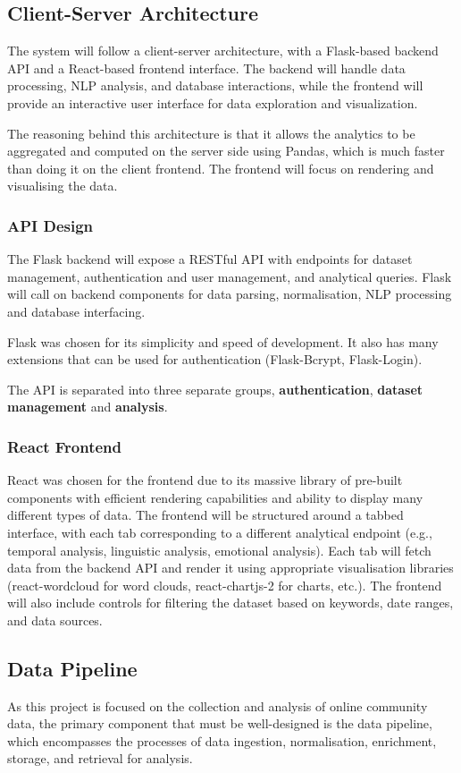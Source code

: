 \documentclass[12pt, a4paper]{article}
\begin{document}
\subsection{Client-Server Architecture}
The system will follow a client-server architecture, with a Flask-based backend API and a React-based frontend interface. The backend will handle data processing, NLP analysis, and database interactions, while the frontend will provide an interactive user interface for data exploration and visualization.

The reasoning behind this architecture is that it allows the analytics to be aggregated and computed on the server side using Pandas, which is much faster than doing it on the client frontend. The frontend will focus on rendering and visualising the data.

\subsubsection{API Design}
The Flask backend will expose a RESTful API with endpoints for dataset management, authentication and user management, and analytical queries. Flask will call on backend components for data parsing, normalisation, NLP processing and database interfacing. 

Flask was chosen for its simplicity and speed of development. It also has many extensions that can be used for authentication (Flask-Bcrypt, Flask-Login).

The API is separated into three separate groups, \textbf{authentication}, \textbf{dataset management} and \textbf{analysis}. 

\subsubsection{React Frontend}
React was chosen for the frontend due to its massive library of pre-built components with efficient rendering capabilities and ability to display many different types of data. The frontend will be structured around a tabbed interface, with each tab corresponding to a different analytical endpoint (e.g., temporal analysis, linguistic analysis, emotional analysis). Each tab will fetch data from the backend API and render it using appropriate visualisation libraries (react-wordcloud for word clouds, react-chartjs-2 for charts, etc.). The frontend will also include controls for filtering the dataset based on keywords, date ranges, and data sources.

\subsection{Data Pipeline}
As this project is focused on the collection and analysis of online community data, the primary component that must be well-designed is the data pipeline, which encompasses the processes of data ingestion, normalisation, enrichment, storage, and retrieval for analysis.
\end{document}
